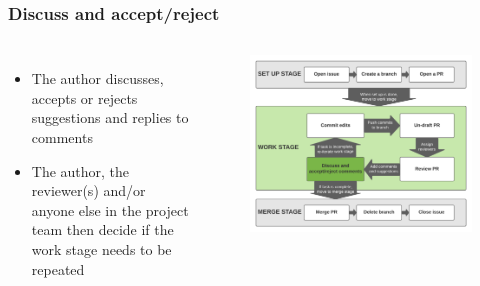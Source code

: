 \documentclass[aspectratio=169]{beamer} %
\begin{document}
\begin{frame}
	\frametitle{Discuss and accept/reject}
	\begin{columns}[c]

		\begin{itemize}
			\setlength\itemsep{1em}
			\item The author discusses, accepts or rejects suggestions
			and replies to comments
			\item The author, the reviewer(s)
			and/or anyone else in the project team then
			decide if the work stage needs to be repeated
		\end{itemize}

		\vspace{-.75cm}
		\begin{figure}
			\centering
			\includegraphics[width=\textwidth]{./img/branch-pr-merge-cycle-S2-4.png}
		\end{figure}

	\end{columns}
\end{frame}
\end{document}
